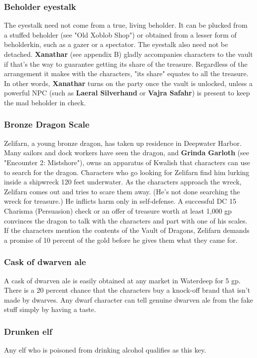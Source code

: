 \documentclass[10pt,a4paper,twoside,twocolumn,openany,nodeprecatedcode]{dndbook}
\begin{document}
\subsubsection{Beholder eyestalk}
The eyestalk need not come from a true, living beholder. It can be plucked from a stuffed beholder (see "Old Xoblob Shop") or obtained from a lesser form of beholderkin, such as a gazer or a spectator. The eyestalk also need not be detached. \textbf{Xanathar} (see appendix B) gladly accompanies characters to the vault if that's the way to guarantee getting its share of the treasure. Regardless of the arrangement it makes with the characters, "its share" equates to all the treasure. In other words, \textbf{Xanathar} turns on the party once the vault is unlocked, unless a powerful NPC (such as \textbf{Laeral Silverhand} or \textbf{Vajra Safahr}) is present to keep the mad beholder in check.
\subsubsection{Bronze Dragon Scale}
Zelifarn, a young bronze dragon, has taken up residence in Deepwater Harbor. Many sailors and dock workers have seen the dragon, and \textbf{Grinda Garloth} (see "Encounter 2: Mistshore"), owns an apparatus of Kwalish that characters can use to search for the dragon. Characters who go looking for Zelifarn find him lurking inside a shipwreck 120 feet underwater. As the characters approach the wreck, Zelifarn comes out and tries to scare them away. (He's not done searching the wreck for treasure.) He inflicts harm only in self-defense. A successful DC 15 Charisma (Persuasion) check or an offer of treasure worth at least 1,000 gp convinces the dragon to talk with the characters and part with one of his scales. If the characters mention the contents of the Vault of Dragons, Zelifarn demands a promise of 10 percent of the gold before he gives them what they came for.
\subsubsection{Cask of dwarven ale}
A cask of dwarven ale is easily obtained at any market in Waterdeep for 5 gp. There is a 20 percent chance that the characters buy a knock-off brand that isn't made by dwarves. Any dwarf character can tell genuine dwarven ale from the fake stuff simply by having a taste.
\subsubsection{Drunken elf}
Any elf who is poisoned from drinking alcohol qualifies as this key.
\end{document}
